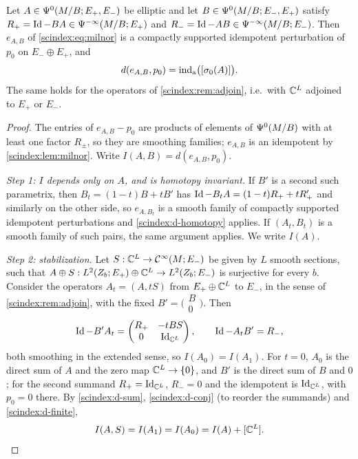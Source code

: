 \begin{proposition}\label{scindex:prop:index-relative}
  Let $A\in\Psi^{0}(M/B;E_+,E_-)$ be elliptic and let $B\in\Psi^{0}(M/B;E_-,E_+)$
  satisfy $R_+=\operatorname{Id}-BA\in\Psi^{-\infty}(M/B;E_+)$ and $R_-=\operatorname{Id}-AB\in
  \Psi^{-\infty}(M/B;E_-)$. Then $e_{A,B}$ of \eqref{scindex:eq:milnor} is a
  compactly supported idempotent perturbation of $p_0$ on $E_-\oplus E_+$, and
  \begin{equation*}
    d(e_{A,B},p_0)=\operatorname{ind}_{\mathrm{a}}\bigl([\sigma_0(A)]\bigr).
  \end{equation*}
  The same holds for the operators of \cref{scindex:rem:adjoin}, i.e.\ with
  $\mathbb{C}^L$ adjoined to $E_+$ or $E_-$.
\end{proposition}
\begin{proof}
  The entries of $e_{A,B}-p_0$ are products of elements of $\Psi^{0}(M/B)$ with at
  least one factor $R_\pm$, so they are smoothing families; $e_{A,B}$ is an
  idempotent by \cref{scindex:lem:milnor}. Write $I(A,B)=d(e_{A,B},p_0)$.

  \emph{Step 1: $I$ depends only on $A$, and is homotopy invariant.} If $B'$ is a
  second such parametrix, then $B_t=(1-t)B+tB'$ has $\operatorname{Id}-B_tA=(1-t)R_++tR'_+$
  and similarly on the other side, so $e_{A,B_t}$ is a smooth family of compactly
  supported idempotent perturbations and \ref{scindex:d-homotopy} applies. If
  $(A_t,B_t)$ is a smooth family of such pairs, the same argument applies. We
  write $I(A)$.

  \emph{Step 2: stabilization.} Let $S:\mathbb{C}^L\to\mathcal{C}^\infty(M;E_-)$ be given by $L$ smooth
  sections, such that $A\oplus S:L^2(Z_b;E_+)\oplus\mathbb{C}^L\to L^2(Z_b;E_-)$ is
  surjective for every $b$. Consider the operators $A_t=(A,tS)$ from $E_+\oplus\mathbb{C}^L$
  to $E_-$, in the sense of \cref{scindex:rem:adjoin}, with the fixed
  $B'=\bigl(\begin{smallmatrix}B\\0\end{smallmatrix}\bigr)$. Then
  \begin{equation*}
    \operatorname{Id}-B'A_t=\begin{pmatrix}R_+&-tBS\\0&\operatorname{Id}_{\mathbb{C}^L}\end{pmatrix},\qquad
    \operatorname{Id}-A_tB'=R_-,
  \end{equation*}
  both smoothing in the extended sense, so $I(A_0)=I(A_1)$. For $t=0$, $A_0$ is
  the direct sum of $A$ and the zero map $\mathbb{C}^L\to\{0\}$, and $B'$ is the direct
  sum of $B$ and $0$; for the second summand $R_+=\operatorname{Id}_{\mathbb{C}^L}$, $R_-=0$ and the
  idempotent is $\operatorname{Id}_{\mathbb{C}^L}$, with $p_0=0$ there. By \ref{scindex:d-sum},
  \ref{scindex:d-conj} (to reorder the summands) and \ref{scindex:d-finite},
  \begin{equation*}
    I(A,S)=I(A_1)=I(A_0)=I(A)+[\mathbb{C}^L].
  \end{equation*}


\end{proof}
